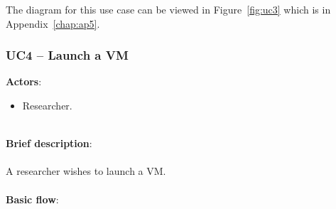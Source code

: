 The diagram for this use case can be viewed in Figure~\ref{fig:uc3} which is in Appendix~\ref{chap:ap5}.

\subsubsection{UC4 -- Launch a VM}\label{uc4}

\textbf{Actors}:

\begin{itemize}
\item Researcher.
\end{itemize}

\ \\
\textbf{Brief description}:\\
\ \\
A researcher wishes to launch a VM.\\
\ \\
\textbf{Basic flow}:


